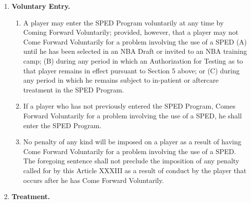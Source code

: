 \documentclass[
]{book}
\providecommand{\tightlist}{%
  \setlength{\itemsep}{0pt}\setlength{\parskip}{0pt}}
\begin{document}
\begin{enumerate}
\def\labelenumi{(\alph{enumi})}
\tightlist
\item
  \textbf{Voluntary Entry.}

  \begin{enumerate}
  \def\labelenumii{(\roman{enumii})}
  \tightlist
  \item
    A player may enter the SPED Program voluntarily at any time by Coming Forward Voluntarily; provided, however, that a player may not Come Forward Voluntarily for a problem involving the use of a SPED (A) until he has been selected in an NBA Draft or invited to an NBA training camp; (B) during any period in which an Authorization for Testing as to that player remains in effect pursuant to Section 5 above; or (C) during any period in which he remains subject to in-patient or aftercare treatment in the SPED Program.
  \item
    If a player who has not previously entered the SPED Program, Comes Forward Voluntarily for a problem involving the use of a SPED, he shall enter the SPED Program.
  \item
    No penalty of any kind will be imposed on a player as a result of having Come Forward Voluntarily for a problem involving the use of a SPED. The foregoing sentence shall not preclude the imposition of any penalty called for by this Article XXXIII as a result of conduct by the player that occurs after he has Come Forward Voluntarily.
  \end{enumerate}
\item
  \textbf{Treatment.}


\end{enumerate}
\end{document}
